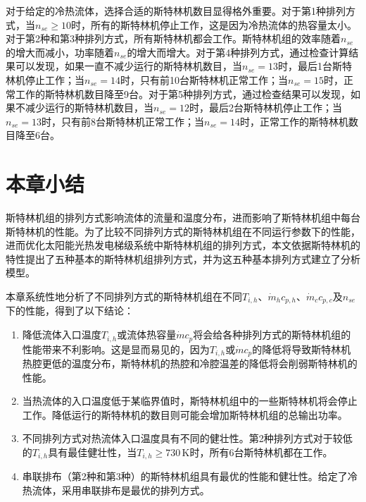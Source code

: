 对于给定的冷热流体，选择合适的斯特林机数目显得格外重要。对于第1种排列方式，当$n_{se} \geqslant 10$时，所有的斯特林机停止工作，这是因为冷热流体的热容量太小。对于第2种和第3种排列方式，所有斯特林机都会工作。斯特林机组的效率随着$n_{se}$的增大而减小，功率随着$n_{se}$的增大而增大。对于第4种排列方式，通过检查计算结果可以发现，如果一直不减少运行的斯特林机数目，当$n_{se} = 13$时，最后1台斯特林机停止工作；当$n_{se} = 14$时，只有前10台斯特林机正常工作；当$n_{se} = 15$时，正常工作的斯特林机数目降至9台。对于第5种排列方式，通过检查结果可以发现，如果不减少运行的斯特林机数目，当$n_{se} = 12$时，最后2台斯特林机停止工作；当$n_{se} = 13$时，只有前8台斯特林机正常工作；当$n_{se} = 14$时，正常工作的斯特林机数目降至6台。

\section{本章小结}

斯特林机组的排列方式影响流体的流量和温度分布，进而影响了斯特林机组中每台斯特林机的性能。为了比较不同排列方式的斯特林机组在不同运行参数下的性能，进而优化太阳能光热发电梯级系统中斯特林机组的排列方式，本文依据斯特林机的特性提出了五种基本的斯特林机组排列方式，并为这五种基本排列方式建立了分析模型。

本章系统性地分析了不同排列方式的斯特林机组在不同$T_{i,h}$、$\dot{m}_hc_{p,h}$、$\dot{m}_cc_{p,c}$及$n_{se}$下的性能，得到了以下结论：

\begin{enumerate}[label=(\arabic*)]
	\item 降低流体入口温度$T_{i,h}$或流体热容量$\dot{m}c_{p}$将会给各种排列方式的斯特林机组的性能带来不利影响。这是显而易见的，因为$T_{i,h}$或$\dot{m}c_p$的降低将导致斯特林机热腔更低的温度分布，斯特林机的热腔和冷腔温差的降低将会削弱斯特林机的性能。
	\item 当热流体的入口温度低于某临界值时，斯特林机组中的一些斯特林机将会停止工作。降低运行的斯特林机的数目则可能会增加斯特林机组的总输出功率。
	\item 不同排列方式对热流体入口温度具有不同的健壮性。第2种排列方式对于较低的$T_{i,h}$具有最佳健壮性，当$T_{i,h} \geqslant 730\,\mathrm{K}$时，所有6台斯特林机都在工作。
	\item 串联排布（第2种和第3种）的斯特林机组具有最优的性能和健壮性。给定了冷热流体，采用串联排布是最优的排列方式。
\end{enumerate}